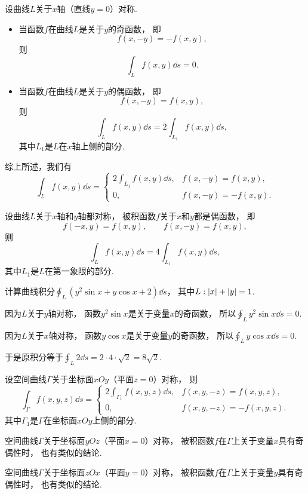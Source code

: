 设曲线\(L\)关于\(x\)轴（直线\(y=0\)）对称.
\begin{itemize}
	\item 当函数\(f\)在曲线\(L\)是关于\(y\)的奇函数，
	即\[
		f(x,-y) = -f(x,y),
	\]
	则\[
		\int_L f(x,y) \dd{s} = 0.
	\]

	\item 当函数\(f\)在曲线\(L\)是关于\(y\)的偶函数，
	即\[
		f(x,-y) = f(x,y),
	\]
	则\[
		\int_L f(x,y) \dd{s}
		= 2 \int_{L_1} f(x,y) \dd{s},
	\]
	其中\(L_1\)是\(L\)在\(x\)轴上侧的部分.
\end{itemize}
综上所述，我们有\[
	\int_L f(x,y) \dd{s}
	= \left\{ \begin{array}{cc}
		2 \int_{L_1} f(x,y) \dd{s}, & f(x,-y) = f(x,y), \\
		0, & f(x,-y) = -f(x,y).
	\end{array} \right.
\]

设曲线\(L\)关于\(x\)轴和\(y\)轴都对称，
被积函数\(f\)关于\(x\)和\(y\)都是偶函数，
即\[
	f(-x,y) = f(x,y),
	\qquad
	f(x,-y) = f(x,y),
\]
则\[
	\int_L f(x,y) \dd{s}
	= 4 \int_{L_1} f(x,y) \dd{s},
\]
其中\(L_1\)是\(L\)在第一象限的部分.

\begin{example}
计算曲线积分\(\oint_L (y^2 \sin x + y \cos x + 2) \dd{s}\)，
其中\(L: \abs{x}+\abs{y}=1\).
\begin{solution}
因为\(L\)关于\(y\)轴对称，
函数\(y^2 \sin x\)是关于变量\(x\)的奇函数，
所以\(\oint_L y^2 \sin x \dd{s} = 0\).

因为\(L\)关于\(x\)轴对称，
函数\(y \cos x\)是关于变量\(y\)的奇函数，
所以\(\oint_L y \cos x \dd{s} = 0\).

于是原积分等于\(\oint_L 2 \dd{s} = 2\cdot4\cdot\sqrt2 = 8\sqrt2\).
\end{solution}
\end{example}

设空间曲线\(\Gamma\)关于坐标面\(xOy\)（平面\(z=0\)）对称，
则\[
	\int_\Gamma f(x,y,z) \dd{s}
	= \left\{ \begin{array}{cc}
		2 \int_{\Gamma_1} f(x,y,z) \dd{s}, & f(x,y,-z) = f(x,y,z), \\
		0, & f(x,y,-z) = -f(x,y,z).
	\end{array} \right.
\]
其中\(\Gamma_1\)是\(\Gamma\)在坐标面\(xOy\)上侧的部分.

空间曲线\(\Gamma\)关于坐标面\(yOz\)（平面\(x=0\)）对称，
被积函数\(f\)在\(\Gamma\)上关于变量\(x\)具有奇偶性时，
也有类似的结论.

空间曲线\(\Gamma\)关于坐标面\(zOx\)（平面\(y=0\)）对称，
被积函数\(f\)在\(\Gamma\)上关于变量\(y\)具有奇偶性时，
也有类似的结论.

